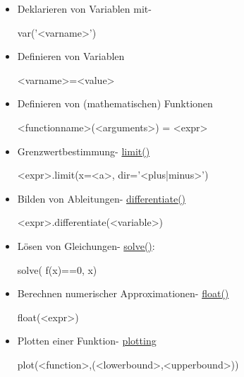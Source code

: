 \documentclass[a4paper,9pt,DIV15,twocolumn]{scrartcl}
\begin{document}
\begin{itemize}
 \item Deklarieren von Variablen mit- \href{}{}
\begin{sagein}
var('<varname>')
\end{sagein}
\item Definieren von Variablen 
    \begin{sagein}
<varname>=<value>        
    \end{sagein}
\item Definieren von (mathematischen) Funktionen 
    \begin{sagein}
<functionname>(<arguments>) = <expr>
    \end{sagein}
\item Grenzwertbestimmung- \href{https://sage.math.uni-goettingen.de/doc/static/reference/sage/calculus/functional.html?highlight=function#sage.calculus.functional.limit}{limit()}
    \begin{sagein}
<expr>.limit(x=<a>, dir='<plus|minus>')
    \end{sagein}
\item Bilden von Ableitungen- \href{https://sage.math.uni-goettingen.de/doc/static/reference/sage/symbolic/expression.html?highlight=differentiate#sage.symbolic.expression.Expression.differentiate}{differentiate()}
\begin{sagein}
<expr>.differentiate(<variable>)
\end{sagein}

\item Lösen von Gleichungen- \href{https://sage.math.uni-goettingen.de/doc/static/reference/sage/symbolic/relation.html?highlight=symbolic.relation#sage.symbolic.relation.solve}{solve()}:
\begin{sagein}
solve( f(x)==0, x)
\end{sagein}

\item Berechnen numerischer Approximationen- \href{http://docs.python.org/library/functions.html#float}{float()}
\begin{sagein}
float(<expr>)
\end{sagein}
\item Plotten einer Funktion- \href{https://sage.math.uni-goettingen.de/doc/static/reference/sage/plot/plot.html?highlight=.plot#d-plotting}{plotting}
\begin{sagein}
plot(<function>,(<lowerbound>,<upperbound>))
\end{sagein}
\end{itemize}
\end{document}
